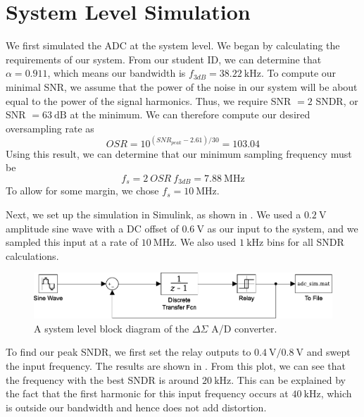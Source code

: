 \documentclass[journal,hidelinks]{IEEEtran}
\begin{document}
\section{System Level Simulation}

We first simulated the ADC at the system level. We began by calculating the requirements of our system. From our student ID, we can determine that $\alpha = 0.911$, which means our bandwidth is $f_{3dB} = \SI{38.22}{\kilo\hertz}$. To compute our minimal SNR, we assume that the power of the noise in our system will be about equal to the power of the signal harmonics. Thus, we require SNR $= 2$ SNDR, or SNR $= \SI{63}{\deci\bel}$ at the minimum. We can therefore compute our desired oversampling rate as
\[ OSR = 10^{(SNR_{peak} - 2.61)/30} = 103.04 \]
Using this result, we can determine that our minimum sampling frequency must be
\[ f_s = 2 \  OSR \  f_{3dB} = \SI{7.88}{\mega\hertz} \]
To allow for some margin, we chose $f_s = \SI{10}{\mega\hertz}$.

Next, we set up the simulation in Simulink, as shown in . We used a $\SI{0.2}{\volt}$ amplitude sine wave with a DC offset of $\SI{0.6}{\volt}$ as our input to the system, and we sampled this input at a rate of $\SI{10}{\mega\hertz}$. We also used $\SI{1}{\kilo\hertz}$ bins for all SNDR calculations.

\begin{figure}[!htb]
  \centering
  \includegraphics[width=\columnwidth]{simulation/adc_sim.pdf}
  \caption{A system level block diagram of the $\Delta \Sigma$ A/D converter.}
  \label{fig:sim_diagram}
\end{figure}

To find our peak SNDR, we first set the relay outputs to $\SI{0.4}{\volt}/\SI{0.8}{\volt}$ and swept the input frequency. The results are shown in . From this plot, we can see that the frequency with the best SNDR is around $\SI{20}{\kilo\hertz}$. This can be explained by the fact that the first harmonic for this input frequency occurs at $\SI{40}{\kilo\hertz}$, which is outside our bandwidth and hence does not add distortion.
\end{document}
